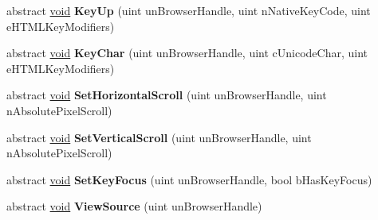 \begin{DoxyCompactItemize}
\item 
\hypertarget{classValve_1_1Steamworks_1_1ISteamHTMLSurface_ae5b77950ebdc7eb0732051a2ef4162d1}{}abstract \hyperlink{SDL__audio_8h_a52835ae37c4bb905b903cbaf5d04b05f}{void} {\bfseries Key\+Up} (uint un\+Browser\+Handle, uint n\+Native\+Key\+Code, uint e\+H\+T\+M\+L\+Key\+Modifiers)\label{classValve_1_1Steamworks_1_1ISteamHTMLSurface_ae5b77950ebdc7eb0732051a2ef4162d1}

\item 
\hypertarget{classValve_1_1Steamworks_1_1ISteamHTMLSurface_ad07898c0d28df4f73ccf9d3e6218c6fe}{}abstract \hyperlink{SDL__audio_8h_a52835ae37c4bb905b903cbaf5d04b05f}{void} {\bfseries Key\+Char} (uint un\+Browser\+Handle, uint c\+Unicode\+Char, uint e\+H\+T\+M\+L\+Key\+Modifiers)\label{classValve_1_1Steamworks_1_1ISteamHTMLSurface_ad07898c0d28df4f73ccf9d3e6218c6fe}

\item 
\hypertarget{classValve_1_1Steamworks_1_1ISteamHTMLSurface_a74dad5030fe838223953a8852e994315}{}abstract \hyperlink{SDL__audio_8h_a52835ae37c4bb905b903cbaf5d04b05f}{void} {\bfseries Set\+Horizontal\+Scroll} (uint un\+Browser\+Handle, uint n\+Absolute\+Pixel\+Scroll)\label{classValve_1_1Steamworks_1_1ISteamHTMLSurface_a74dad5030fe838223953a8852e994315}

\item 
\hypertarget{classValve_1_1Steamworks_1_1ISteamHTMLSurface_a173afbb7cf0b6b086744f44f4d8638a4}{}abstract \hyperlink{SDL__audio_8h_a52835ae37c4bb905b903cbaf5d04b05f}{void} {\bfseries Set\+Vertical\+Scroll} (uint un\+Browser\+Handle, uint n\+Absolute\+Pixel\+Scroll)\label{classValve_1_1Steamworks_1_1ISteamHTMLSurface_a173afbb7cf0b6b086744f44f4d8638a4}

\item 
\hypertarget{classValve_1_1Steamworks_1_1ISteamHTMLSurface_a7a3ed8d58c67c56c2251937b47b535ab}{}abstract \hyperlink{SDL__audio_8h_a52835ae37c4bb905b903cbaf5d04b05f}{void} {\bfseries Set\+Key\+Focus} (uint un\+Browser\+Handle, bool b\+Has\+Key\+Focus)\label{classValve_1_1Steamworks_1_1ISteamHTMLSurface_a7a3ed8d58c67c56c2251937b47b535ab}

\item 
\hypertarget{classValve_1_1Steamworks_1_1ISteamHTMLSurface_aa1e3bb90a3af74f45a9455fd9c7c9c91}{}abstract \hyperlink{SDL__audio_8h_a52835ae37c4bb905b903cbaf5d04b05f}{void} {\bfseries View\+Source} (uint un\+Browser\+Handle)\label{classValve_1_1Steamworks_1_1ISteamHTMLSurface_aa1e3bb90a3af74f45a9455fd9c7c9c91}


\end{DoxyCompactItemize}
